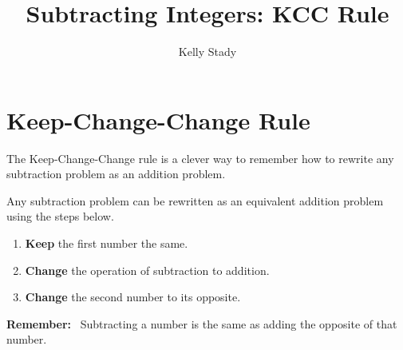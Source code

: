 \documentclass[font=12pt, handout]{ximera}
\title{Subtracting Integers: KCC Rule}   %
\author{Kelly Stady}
\begin{document}
\begin{abstract}

\end{abstract}

\maketitle
\label{xim:SubtractIntKCCActivity}

\section*{Keep-Change-Change Rule}

The Keep-Change-Change rule is a clever way to remember how to rewrite any subtraction problem as an addition problem.

\begin{procedure}

Any subtraction problem can be rewritten as an equivalent addition problem using the steps below.

\begin{enumerate}
\item \textbf{Keep} the first number the same.

\item \textbf{Change} the operation of subtraction to addition.

\item \textbf{Change} the second number to its opposite.

\end{enumerate}

\textcolor{accessibleOrange}{\textbf{Remember:}}  \ Subtracting a number is the same as adding the opposite of that number.
\end{procedure}
\end{document}
